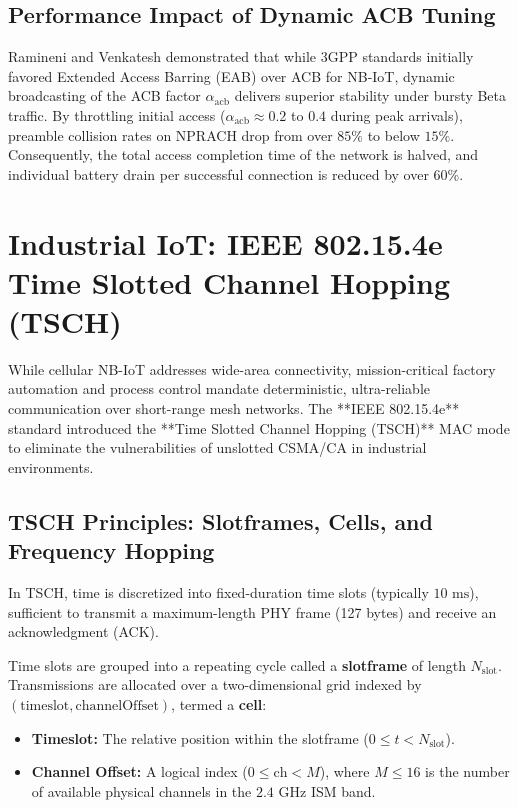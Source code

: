 \subsection{Performance Impact of Dynamic ACB Tuning}
Ramineni and Venkatesh \cite{ramineni2019impact} demonstrated that while 3GPP standards initially favored Extended Access Barring (EAB) over ACB for NB-IoT, dynamic broadcasting of the ACB factor $\alpha_{\text{acb}}$ delivers superior stability under bursty Beta traffic. By throttling initial access ($\alpha_{\text{acb}} \approx 0.2$ to $0.4$ during peak arrivals), preamble collision rates on NPRACH drop from over $85\%$ to below $15\%$. Consequently, the total access completion time of the network is halved, and individual battery drain per successful connection is reduced by over $60\%$.

\section{Industrial IoT: IEEE 802.15.4e Time Slotted Channel Hopping (TSCH)}
\label{sec:tsch_fundamentals}

While cellular NB-IoT addresses wide-area connectivity, mission-critical factory automation and process control mandate deterministic, ultra-reliable communication over short-range mesh networks. The **IEEE 802.15.4e** standard introduced the **Time Slotted Channel Hopping (TSCH)** MAC mode to eliminate the vulnerabilities of unslotted CSMA/CA in industrial environments.

\subsection{TSCH Principles: Slotframes, Cells, and Frequency Hopping}
In TSCH, time is discretized into fixed-duration time slots (typically $10\text{~ms}$), sufficient to transmit a maximum-length PHY frame (127 bytes) and receive an acknowledgment (ACK).

Time slots are grouped into a repeating cycle called a \textbf{slotframe} of length $N_{\text{slot}}$. Transmissions are allocated over a two-dimensional grid indexed by $(\text{timeslot}, \text{channelOffset})$, termed a \textbf{cell}:
\begin{itemize}
    \item \textbf{Timeslot:} The relative position within the slotframe ($0 \le t < N_{\text{slot}}$).
    \item \textbf{Channel Offset:} A logical index ($0 \le \text{ch} < M$), where $M \le 16$ is the number of available physical channels in the $2.4\text{~GHz}$ ISM band.
\end{itemize}

